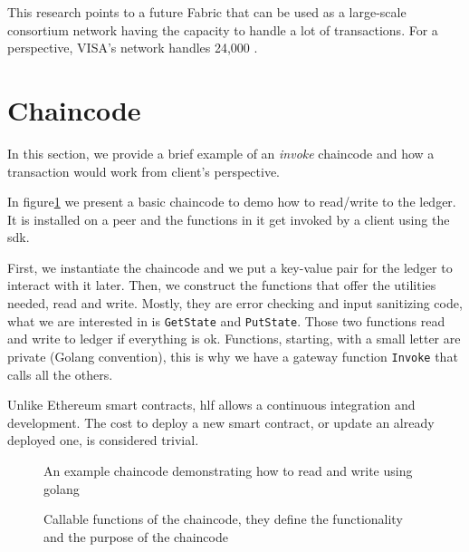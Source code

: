 This research points to a future Fabric that can be used as a large-scale consortium network having the capacity to handle a lot of transactions. For a perspective, VISA's network handles 24,000  \cite{visa-txs-ps}.

\section{Chaincode}
In this section, we provide a brief example of an \textit{invoke} chaincode and how a transaction would work from client's perspective.

In figure\ref{fig:examplecc} we present a basic chaincode to demo how to read/write to the ledger. It is installed on a peer and the functions in it get invoked by a client using the \acrshort{sdk}.

First, we instantiate the chaincode and we put a key-value pair for the ledger to interact with it later. Then, we construct the functions that offer the utilities needed, read and write. Mostly, they are error checking and input sanitizing code, what we are interested in is \verb|GetState| and \verb|PutState|. Those two functions read and write to ledger if everything is ok. 
Functions, starting, with a small letter are private (Golang convention), this is why we have a gateway function \verb|Invoke| that calls all the others.

Unlike Ethereum smart contracts, \acrshort{hlf} allows a continuous integration and development. The  cost to deploy a new smart contract, or update an already deployed one, is considered trivial. 
\begin{figure}
    \centering
     
    \caption{An example chaincode demonstrating how to read and write using golang}
    \label{fig:examplecc}
\end{figure}

\begin{figure}
    \centering
    
    \caption{Callable functions of the chaincode, they define the functionality and the purpose of the chaincode}
    \label{fig:funcscc}
\end{figure}